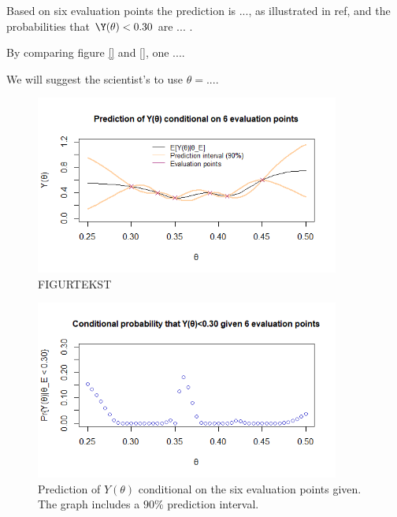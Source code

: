 Based on six evaluation points the prediction is ..., as illustrated in ref{}, and the probabilities that $\Y(\theta) < 0.30$ are ... .

By comparing figure \ref{} and \ref{}, one .... 

We will suggest the scientist's to use $\theta = ... $. 

\begin{figure}
    \centering
    \includegraphics[width=100mm]{2cPred.png}
    \caption{ FIGURTEKST }
    \label{2cPred}
\end{figure}
\begin{figure}
    \centering
    \includegraphics[width=100mm]{2ctheta.png}
    \caption{Prediction of $Y(\theta)$ conditional on the six evaluation points given. The graph includes a $90\%$ prediction interval. }
    \label{2bTheta}
\end{figure}